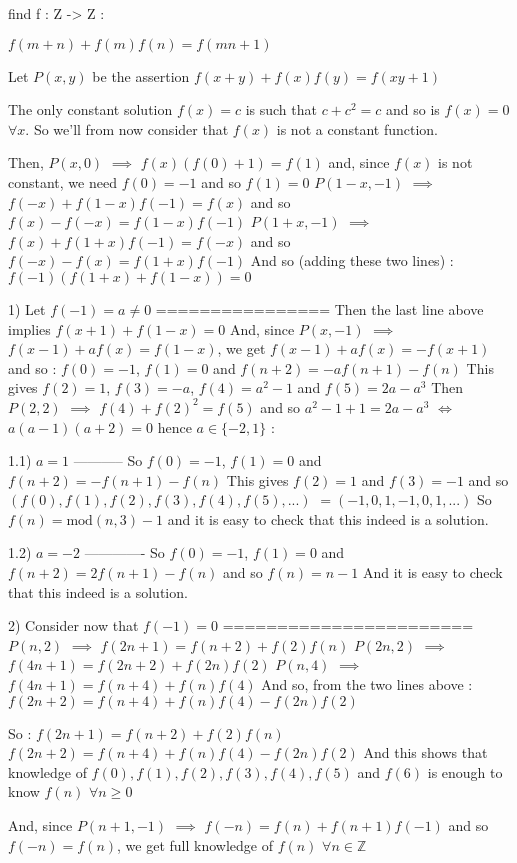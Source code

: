 \begin{solution}
	\begin{tcolorbox}[quote="HTA"]find f : Z -> Z :

$ f(m + n) + f(m)f(n) = f(mn + 1 )$\end{tcolorbox}
Let $ P(x,y)$ be the assertion $ f(x+y)+f(x)f(y)=f(xy+1)$

The only constant solution $ f(x)=c$ is such that $ c+c^2=c$ and so is $ f(x)=0$ $ \forall x$. So we'll from now consider that $ f(x)$ is not a constant function.

Then, $ P(x,0)$ $ \implies$ $ f(x)(f(0)+1)=f(1)$ and, since $ f(x)$ is not constant, we need $ f(0)=-1$ and so $ f(1)=0$
$ P(1-x,-1)$ $ \implies$ $ f(-x)+f(1-x)f(-1)=f(x)$ and so $ f(x)-f(-x)=f(1-x)f(-1)$
$ P(1+x,-1)$ $ \implies$ $ f(x)+f(1+x)f(-1)=f(-x)$ and so $ f(-x)-f(x)=f(1+x)f(-1)$
And so (adding these two lines) : $ f(-1)(f(1+x)+f(1-x))=0$

1) Let $ f(-1)=a\ne 0$
================
Then the last line above implies $ f(x+1)+f(1-x)=0$
And, since $ P(x,-1)$ $ \implies$ $ f(x-1)+af(x)=f(1-x)$, we get $ f(x-1)+af(x)=-f(x+1)$ and so :
$ f(0)=-1$, $ f(1)=0$ and $ f(n+2)=-af(n+1)-f(n)$
This gives $ f(2)=1$, $ f(3)=-a$, $ f(4)=a^2-1$ and $ f(5)=2a-a^3$
Then $ P(2,2)$ $ \implies$ $ f(4)+f(2)^2=f(5)$ and so $ a^2-1+1=2a-a^3$ $ \iff$ $ a(a-1)(a+2)=0$ hence $ a\in\{-2,1\}$ :

1.1) $ a=1$
-----------
So $ f(0)=-1$, $ f(1)=0$ and $ f(n+2)=-f(n+1)-f(n)$
This gives $ f(2)=1$ and $ f(3)=-1$ and so $ (f(0),f(1),f(2),f(3),f(4),f(5),...)$ $ =(-1,0,1,-1,0,1, ...)$
So $ f(n)=\text{mod}(n,3)-1$ and it is easy to check that this indeed is a solution.

1.2) $ a=-2$
-------------
So $ f(0)=-1$, $ f(1)=0$ and $ f(n+2)=2f(n+1)-f(n)$ and so $ f(n)=n-1$
And it is easy to check that this indeed is a solution.

2) Consider now that $ f(-1)=0$
=======================
$ P(n,2)$ $ \implies$ $ f(2n+1)=f(n+2)+f(2)f(n)$
$ P(2n,2)$ $ \implies$ $ f(4n+1)=f(2n+2)+f(2n)f(2)$
$ P(n,4)$ $ \implies$ $ f(4n+1)=f(n+4)+f(n)f(4)$
And so, from the two lines above : $ f(2n+2)=f(n+4)+f(n)f(4)-f(2n)f(2)$

So :
$ f(2n+1)=f(n+2)+f(2)f(n)$
$ f(2n+2)=f(n+4)+f(n)f(4)-f(2n)f(2)$
And this shows that knowledge of $ f(0),f(1),f(2),f(3),f(4),f(5)$ and $ f(6)$ is enough to know $ f(n)$ $ \forall n\ge 0$

And, since $ P(n+1,-1)$ $ \implies$ $ f(-n)=f(n)+f(n+1)f(-1)$ and so $ f(-n)=f(n)$, we get full knowledge of $ f(n)$ $ \forall 
n\in\mathbb Z$


\end{solution}

